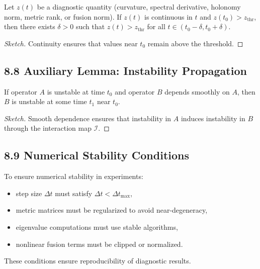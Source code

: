 \begin{lemma}
Let $z(t)$ be a diagnostic quantity (curvature, spectral derivative,
holonomy norm, metric rank, or fusion norm). If $z(t)$ is continuous in
$t$ and $z(t_0) > z_{\mathrm{thr}}$, then there exists $\delta > 0$ such
that $z(t) > z_{\mathrm{thr}}$ for all $t \in (t_0 - \delta, t_0 + \delta)$.
\end{lemma}

\begin{proof}[Sketch]
Continuity ensures that values near $t_0$ remain above the threshold.
\end{proof}

\subsection*{8.8 Auxiliary Lemma: Instability Propagation}

\begin{lemma}[Propagation]
If operator $A$ is unstable at time $t_0$ and operator $B$ depends
smoothly on $A$, then $B$ is unstable at some time $t_1$ near $t_0$.
\end{lemma}

\begin{proof}[Sketch]
Smooth dependence ensures that instability in $A$ induces instability in
$B$ through the interaction map $\mathcal{I}$.
\end{proof}

\subsection*{8.9 Numerical Stability Conditions}

To ensure numerical stability in experiments:
\begin{itemize}
\item step size $\Delta t$ must satisfy $\Delta t < \Delta t_{\max}$,
\item metric matrices must be regularized to avoid near-degeneracy,
\item eigenvalue computations must use stable algorithms,
\item nonlinear fusion terms must be clipped or normalized.
\end{itemize}

These conditions ensure reproducibility of diagnostic results.

